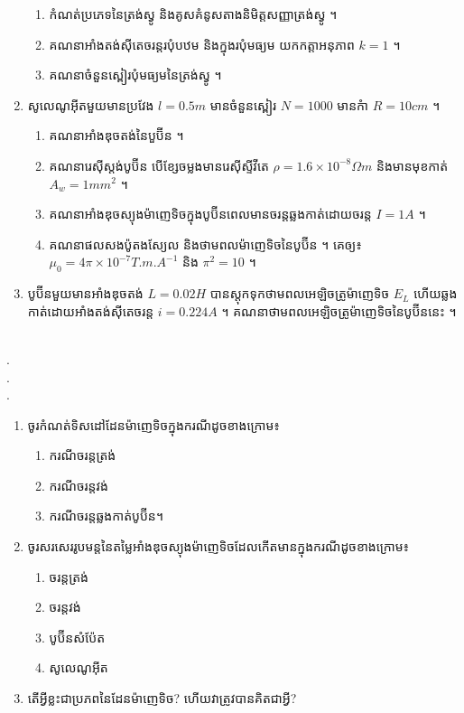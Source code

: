 \documentclass{officialexam}
\begin{document}
\begin{enumerate}[I]
		\begin{enumerate}[k]
			\item កំណត់ប្រភេទនៃត្រង់ស្វូ និងគូសគំនូសតាងនិមិត្តសញ្ញាត្រង់ស្វូ ។
			\item គណនាអាំងតង់ស៊ីតេចរន្តរបុំបឋម និងក្នុងរបុំមធ្យម យកកត្តាអនុភាព $k=1$ ។
			\item គណនាចំនួនស្ពៀរបុំមធ្យមនៃត្រង់ស្វូ ។ 
		\end{enumerate}
		\item សូលេណូអ៊ីតមួយមានប្រវែង $l=0.5m$ មានចំនួនស្ពៀរ $N=1000$ មានកំា $R=10cm$ ។
		\begin{enumerate}[k]
			\item គណនាអាំងឌុចតង់នៃបួប៊ីន ។
			\item គណនារេស៊ីស្តង់បូប៊ីន បើខ្សែចម្លងមានរេស៊ីស្ទីវីតេ $\rho=1.6\times10^{-8}\Omega m$ និងមានមុខកាត់ $A_w=1mm^2$ ។
			\item គណនាអាំងឌុចស្យុងម៉ាញេទិចក្នុងបូប៊ីនពេលមានចរន្តឆ្លងកាត់ដោយចរន្ត $I=1A$ ។
			\item គណនាផលសងប៉ូតងស្យែល និងថាមពលម៉ាញេទិចនៃបូប៊ីន ។ គេឲ្យ៖ $\mu_0=4\pi\times10^{-7}T.m.A^{-1}$ និង $\pi^2=10$ ។ 
		\end{enumerate}
		\item បូប៊ីនមួយមានអាំងឌុចតង់ $L=0.02H$ បានស្តុកទុកថាមពលអេឡិចត្រូម៉ាញេទិច $E_L$ ហើយឆ្លងកាត់ដោយអាំងតង់ស៊ីតេចរន្ត $i=0.224A$ ។ គណនាថាមពលអេឡិចត្រូម៉ាញេទិចនៃបូប៊ីននេះ ។
	\end{enumerate}
\borderline{\bigg[សូមសំណាងល្អគ្រប់ៗគ្នា!\bigg]}\\
{\color{white}.}\dotfill\\
{\color{white}.}\dotfill\\
{\color{white}.}\dotfill
\newpage
{\maketitle}
\begin{enumerate}[k]
	\item ចូរកំណត់ទិសដៅដែនម៉ាញេទិចក្នុងករណីដូចខាងក្រោម៖
	\begin{enumerate}[a,3]
		\item ករណីចរន្តត្រង់
		\item ករណីចរន្តវង់
		\item ករណីចរន្តឆ្លងកាត់បូប៊ីន​។
	\end{enumerate}
	\item ចូរសរសេររូបមន្តនៃតម្លៃអាំងឌុចស្យុងម៉ាញេទិចដែលកើតមានក្នុងករណីដូចខាងក្រោម៖
	\begin{enumerate}[a,4]
		\item ចរន្តត្រង់
		\item ចរន្តវង់
		\item បូប៊ីនសំប៉ែត
		\item សូលេណូអ៊ីត
	\end{enumerate}
	\item តើអ្វីខ្លះជាប្រភពនៃដែនម៉ាញេទិច? ហើយវាត្រូវបានគិតជាអ្វី? 
\end{enumerate}
\end{document}
